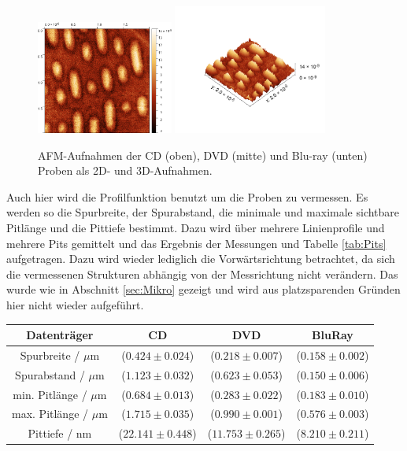 \begin{figure}
            \includegraphics[width = 0.40\textwidth]{pictures/BluRay.png}
            \includegraphics[width = 0.45\textwidth]{pictures/BluRay3D.png}
            \caption{AFM-Aufnahmen der CD (oben), DVD (mitte) und Blu-ray (unten) Proben als 2D- und 3D-Aufnahmen.}
            \label{fig:CDB}    
        \end{figure}
        Auch hier wird die Profilfunktion benutzt um die Proben zu vermessen. Es werden so die Spurbreite, der Spurabstand, die minimale und maximale sichtbare Pitlänge und die Pittiefe bestimmt. Dazu wird über mehrere Linienprofile und mehrere Pits gemittelt und das Ergebnis der Messungen und Tabelle \ref{tab:Pits} aufgetragen.
        Dazu wird wieder lediglich die Vorwärtsrichtung betrachtet, da sich die vermessenen Strukturen abhängig von der Messrichtung nicht verändern. Das wurde wie in Abschnitt \ref{sec:Mikro} gezeigt und wird aus platzsparenden Gründen hier nicht wieder aufgeführt.
        \begin{center}
            \label{tab:Pits}
            \begin{tabular}{c c c c}
                \toprule
                Datenträger & CD & DVD & BluRay \\
                \midrule
                Spurbreite / $\mu\text{m}$    & ($0.424\pm 0.024$) & ($0.218\pm 0.007$) & ($0.158\pm 0.002$) \\
                Spurabstand / $\mu\text{m}$   & ($1.123\pm 0.032$) & ($0.623\pm 0.053$) & ($0.150\pm 0.006$) \\
                min. Pitlänge / $\mu\text{m}$ & ($0.684\pm 0.013$) & ($0.283\pm 0.022$) & ($0.183\pm 0.010$) \\
                max. Pitlänge / $\mu\text{m}$ & ($1.715\pm 0.035$) & ($0.990\pm 0.001$) & ($0.576\pm 0.003$) \\
                Pittiefe / $\text{nm}$        & ($22.141\pm 0.448$)& ($11.753\pm 0.265$) &($8.210\pm 0.211$) \\
                \bottomrule
            \end{tabular}
        \end{center}
